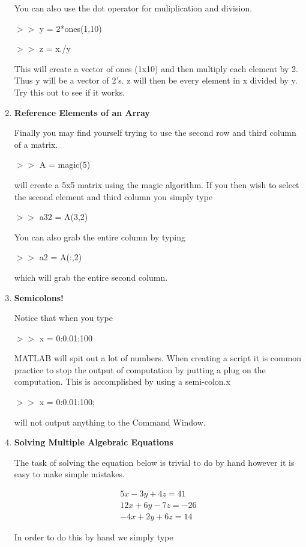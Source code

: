 \begin{enumerate}
You can also use the dot operator for muliplication and division.

$>>$ y = 2*ones(1,10)

$>>$ z = x./y

This will create a vector of ones (1x10) and then multiply each
element by 2. Thus y will be a vector of 2's. z will then be every
element in x divided by y. Try this out to see if it works.

\item \textbf{Reference Elements of an Array}

Finally you may find yourself trying to use the second row and third
column of a matrix. 

$>>$ A = magic(5)

will create a 5x5 matrix using the magic algorithm. If you then wish
to select the second element and third column you simply type

$>>$ a32 = A(3,2)

You can also grab the entire column by typing

$>>$ a2 = A(:,2)

which will grab the entire second column.

\item {\bf Semicolons!}

Notice that when you type

$>>$ x = 0:0.01:100

MATLAB will spit out a lot of numbers. When creating a script it is
common practice to stop the output of computation by putting a plug on
the computation. This is accomplished by using a semi-colon.x

$>>$ x = 0:0.01:100;

will not output anything to the Command Window.

\item {\bf Solving Multiple Algebraic Equations}

The task of solving the equation below is trivial to do by hand
however it is easy to make simple mistakes.

\begin{equation} \nonumber
\begin{matrix}
5x-3y+4z = 41 \\
12x + 6y -7z = -26 \\
-4x + 2y + 6z = 14 
\end{matrix}
\end{equation}

In order to do this by hand we simply type 


\end{enumerate}
